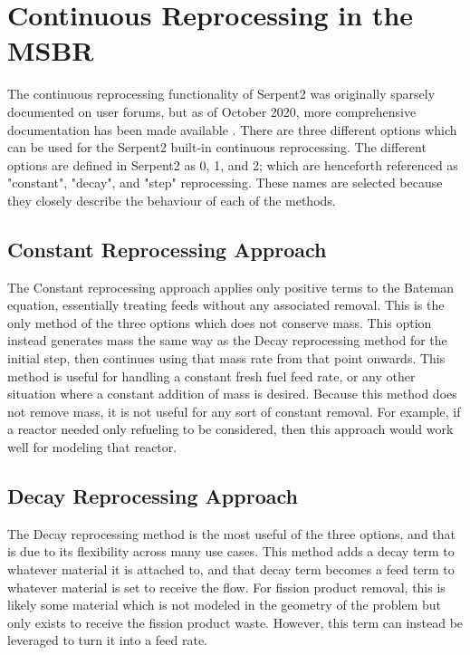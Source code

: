 \section{Continuous Reprocessing in the MSBR}

The continuous reprocessing functionality of Serpent2 was originally sparsely documented on user forums, but as of October 2020, more comprehensive documentation has been made available \cite{seifert_material_2020}.
There are three different options which can be used for the Serpent2 built-in continuous reprocessing. The different options are defined in Serpent2 as 0, 1, and 2; which are henceforth referenced as "constant", "decay", and "step" reprocessing. These names are selected because they closely describe the behaviour of each of the methods.

\subsection{Constant Reprocessing Approach}
The Constant reprocessing approach applies only positive terms to the Bateman equation, essentially treating feeds without any associated removal.
This is the only method of the three options which does not conserve mass. This option instead generates mass the same way as the Decay reprocessing method for the initial step, then continues using that mass rate from that point onwards.
This method is useful for handling a constant fresh fuel feed rate, or any other situation where a constant addition of mass is desired. Because this method does not remove mass, it is not useful for any sort of constant removal.
For example, if a reactor needed only refueling to be considered, then this approach would work well for modeling that reactor.

\subsection{Decay Reprocessing Approach}
The Decay reprocessing method is the most useful of the three options, and that is due to its flexibility across many use cases. This method adds a decay term to whatever material it is attached to, and that decay term becomes a feed term to whatever material is set to receive the flow. For fission product removal, this is likely some material which is not modeled in the geometry of the problem but only exists to receive the fission product waste. However, this term can instead be leveraged to turn it into a feed rate.

